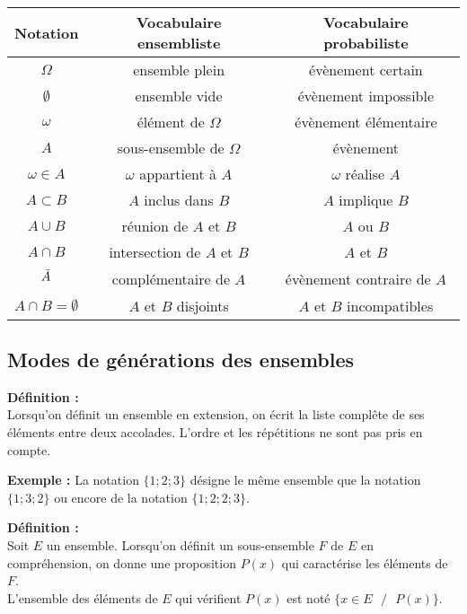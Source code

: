 \documentclass{article}
\begin{document}
\begin{tabular}{|c|c|c|}
  \hline
  Notation & Vocabulaire ensembliste & Vocabulaire probabiliste \\
  \hline
  $\Omega$ & ensemble plein & évènement certain \\
  \hline
  $\emptyset$ & ensemble vide & évènement impossible \\
  \hline
  $\omega$ & élément de $\Omega$ & évènement élémentaire \\
  \hline
  $A$ & sous-ensemble de $\Omega$ & évènement \\
  \hline
  $\omega \in A$ & $\omega$ appartient à $A$ & $\omega$ réalise $A$ \\
  \hline
  $A \subset B$ & $A$ inclus dans $B$ & $A$ implique $B$ \\
  \hline
  $A \cup B$ & réunion de $A$ et $B$ & $A$ ou $B$ \\
  \hline
  $A \cap B$ & intersection de $A$ et $B$ & $A$ et $B$ \\
  \hline
  $\displaystyle \color{white}\frac{_0}{} \color{black}\bar{A} \color{white}\frac{_0}{}$ & complémentaire de $A$ & évènement contraire de $A$ \\
  \hline
  $A \cap B = \emptyset$ & $A$ et $B$ disjoints & $A$ et $B$ incompatibles \\
  \hline
\end{tabular}

\subsection{Modes de générations des ensembles}

\begin{mdframed}[style=definitionStyle]
    \textbf{Définition :} ~\\
    Lorsqu'on définit un ensemble en extension, on écrit la liste complête de ses éléments entre deux accolades. L'ordre et les répétitions ne sont pas pris en compte.
\end{mdframed}

\textbf{Exemple :} La notation $\{1; 2; 3\}$ désigne le même ensemble que la notation $\{1; 3; 2\}$ ou encore de la notation $\{1; 2; 2; 3\}$.
\vspace{4pt}
\begin{mdframed}[style=definitionStyle]
    \textbf{Définition :} ~\\
    Soit $E$ un ensemble. Lorsqu'on définit un sous-ensemble $F$ de $E$ en compréhension, on donne une proposition $P(x)$
    qui caractérise les éléments de $F$. \\
    L'ensemble des éléments de $E$ qui vérifient $P(x)$ est noté $\{x\in E \text{ }/\text{ } P(x)\}$.
\end{mdframed}
\end{document}
